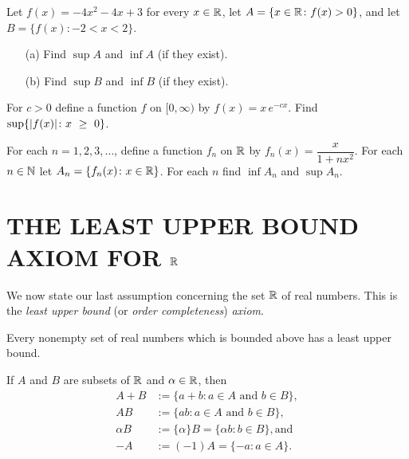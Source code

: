 \begin{prob}\label{prob_sup1}  Let $f(x) = -4x^2 - 4x + 3$ for every $x \in \mathbb{R}$, let
$A = \{x \in \mathbb{R} \colon f(x) > 0\}$, and let  $B = \{f(x) \colon -2 < x < 2\}$.
 \begin{enumerate}
  \item[(a)] Find $\sup A$ and $\inf A$ (if they exist).
  \item[(b)] Find $\sup B$ and $\inf B$ (if they exist).
 \end{enumerate}
\end{prob}

\begin{prob} For $c>0$ define a function $f$ on $[0,\infty)$ by $f(x) = x\,e^{-cx}$.  Find
$\sup\{\lvert f(x)\rvert\colon x~\ge~0\}$.
\end{prob}

\begin{prob}  For each $n = 1,2,3, \dots$, define a function $f_n$ on $\mathbb{R}$ by $f_n(x) =
\dfrac{x}{1+nx^2}$.  For each $n \in \mathbb{N}$ let $A_n = \{f_n(x) \colon x \in \mathbb{R}\}$.  For
each $n$ find $\inf A_n$ and $\sup A_n$.
\end{prob}







\section{THE LEAST UPPER BOUND AXIOM FOR $\mathbb{R}$}
We now state our last assumption concerning the set $\mathbb{R}$ of real numbers.  This is the
\emph{least upper bound} (or
\emph{order completeness}) \emph{axiom}.

\begin{ax}[VII]\label{axiom_lub} Every nonempty set of real numbers which is bounded above has
a least upper bound.
\end{ax}

\begin{notn} If $A$ and $B$ are subsets of $\mathbb{R}$ and $\alpha \in \mathbb{R}$, then
  \begin{align*}
      A + B &:= \{a + b \colon a \in A \text{ and }b \in B\}, \\
         AB &:= \{ab \colon a \in A \text{ and }b \in B\}, \\
   \alpha B &:= \{\alpha\}B = \{\alpha b \colon b \in B\}, \text{and} \\
         -A &:= (-1) A = \{-a \colon a \in A\}.
  \end{align*}
\end{notn}

